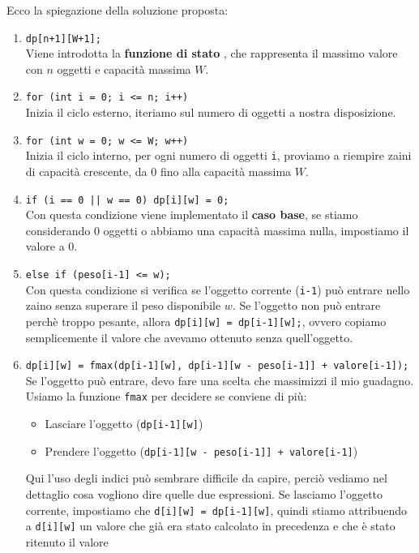 \noindent Ecco la spiegazione della soluzione proposta:
\begin{enumerate}
    \item \texttt{dp[n+1][W+1];}\\
    Viene introdotta la \textbf{funzione di stato} , che rappresenta il massimo valore con $n$ oggetti
    e capacità massima $W$.
    \item \texttt{for (int i = 0; i <= n; i++)}\\ 
    Inizia il ciclo esterno, iteriamo sul numero di oggetti a nostra disposizione.
    \item \texttt{for (int w = 0; w <= W; w++)}\\ 
    Inizia il ciclo interno, per ogni numero di oggetti \texttt{i}, proviamo a
    riempire zaini di capacità crescente, da $0$ fino alla capacità massima $W$.
    \item \texttt{if (i == 0 || w == 0)
                        dp[i][w] = 0;}\\
    Con questa condizione viene implementato il \textbf{caso base}, se stiamo considerando $0$ oggetti o abbiamo una capacità massima nulla, impostiamo il valore a $0$.
    \item \texttt{else if (peso[i-1] <= w);}\\
    Con questa condizione si verifica se l'oggetto corrente (\texttt{i-1}) può entrare nello zaino senza superare il peso disponibile $w$.
    Se l'oggetto non può entrare perchè troppo pesante, allora \texttt{dp[i][w] = dp[i-1][w];}, ovvero copiamo semplicemente il valore che avevamo ottenuto senza quell'oggetto.
    \item \texttt{dp[i][w] = fmax(dp[i-1][w], dp[i-1][w - peso[i-1]] + valore[i-1]);}\\
    Se l'oggetto può entrare, devo fare una scelta che massimizzi il mio guadagno. Usiamo la funzione \texttt{fmax} per decidere se conviene di più:
                \begin{itemize}
                    \item Lasciare l'oggetto (\texttt{dp[i-1][w]})
                    \item Prendere l'oggetto (\texttt{dp[i-1][w - peso[i-1]] + valore[i-1]})
                \end{itemize}
    Qui l'uso degli indici può sembrare difficile da capire, perciò vediamo nel dettaglio cosa vogliono dire quelle due espressioni.
     Se lasciamo l'oggetto corrente, impostiamo che \texttt{d[i][w] = dp[i-1][w]}, quindi stiamo attribuendo a \texttt{d[i][w]} un valore che già era stato calcolato in precedenza e che è stato ritenuto il valore

\end{enumerate}
